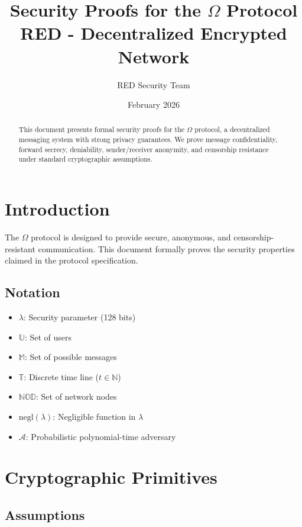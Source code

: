 \documentclass[11pt,a4paper]{article}
\title{Security Proofs for the $\Omega$ Protocol\\\large RED - Decentralized Encrypted Network}
\author{RED Security Team}
\date{February 2026}
\begin{document}
\maketitle

\begin{abstract}
This document presents formal security proofs for the $\Omega$ protocol, a decentralized messaging system with strong privacy guarantees. We prove message confidentiality, forward secrecy, deniability, sender/receiver anonymity, and censorship resistance under standard cryptographic assumptions.
\end{abstract}

\tableofcontents
\newpage

\section{Introduction}

The $\Omega$ protocol is designed to provide secure, anonymous, and censorship-resistant communication. This document formally proves the security properties claimed in the protocol specification.

\subsection{Notation}

\begin{itemize}
    \item $\lambda$: Security parameter (128 bits)
    \item $\mathbb{U}$: Set of users
    \item $\mathbb{M}$: Set of possible messages
    \item $\mathbb{T}$: Discrete time line ($t \in \mathbb{N}$)
    \item $\mathbb{NOD}$: Set of network nodes
    \item $\text{negl}(\lambda)$: Negligible function in $\lambda$
    \item $\mathcal{A}$: Probabilistic polynomial-time adversary
\end{itemize}

\section{Cryptographic Primitives}

\subsection{Assumptions}
\end{document}

